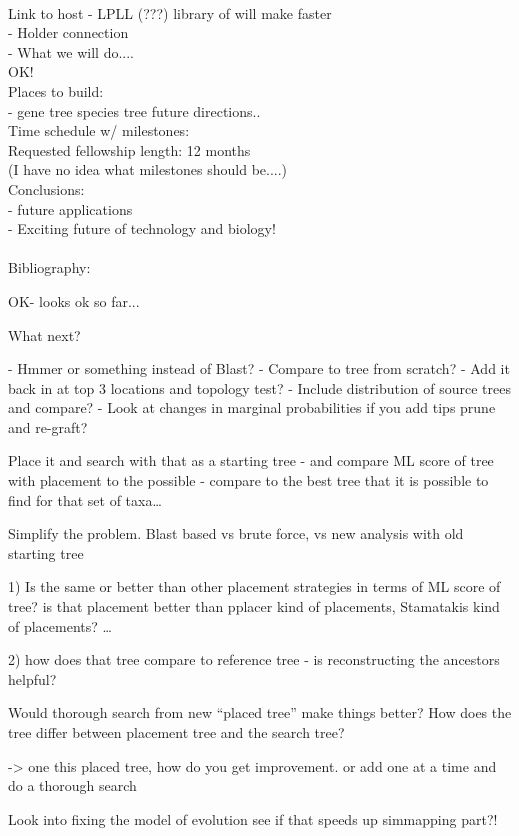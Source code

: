 \\Link to   host -  LPLL (???) library of will make faster
\\       - Holder connection
\\     - What we will do....
\\         OK!
\\     Places to build:
\\         - gene tree species tree future directions..
\\Time schedule w/ milestones:
\\   Requested fellowship length: 12 months
\\   (I have no idea what milestones should be....)
\\Conclusions:
\\   - future applications
\\   - Exciting future of technology and biology!
\\  
\\Bibliography:




OK- looks ok so far...

What next?

- Hmmer or something instead of Blast?
- Compare to tree from scratch?
- Add it back in at top 3 locations and topology test?
- Include distribution of source trees and compare?
- Look at changes in marginal probabilities if you add tips prune and re-graft?

Place it and search with that as a starting tree - 
and compare ML score of tree with placement to the possible - compare to the best tree that it is possible to find for that set of taxa…

Simplify the problem.
Blast based vs brute force, vs new analysis with old starting tree

1) Is the same or better than other placement strategies in terms of ML score of tree?
is that placement better than pplacer kind of placements, Stamatakis kind of placements? … 

2) how does that tree compare to reference tree
- is reconstructing the ancestors helpful?

Would thorough search from new “placed tree” make things better?
How does the tree differ between placement tree and the search tree?


-> one this placed tree, how do you get improvement.
or add one at a time and do a thorough search 

Look into fixing the model of evolution see if that speeds up simmapping part?!


